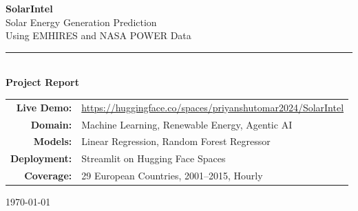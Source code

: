 \documentclass[12pt, a4paper]{article}
\begin{document}
\begin{titlepage}
    \centering
    \vspace*{1.5cm}

    {\huge\bfseries\color{solarblue} SolarIntel}\\[0.6cm]
    {\Large\color{solaramber} Solar Energy Generation Prediction}\\[0.3cm]
    {\large Using EMHIRES and NASA POWER Data}\\[0.4cm]
    \rule{\linewidth}{1.5pt}\\[0.8cm]

    {\large\textbf{Project Report}}

    \vspace{1.5cm}

    \begin{tabular}{rl}
        \textbf{Live Demo:} & \url{https://huggingface.co/spaces/priyanshutomar2024/SolarIntel} \\[4pt]
        \textbf{Domain:} & Machine Learning, Renewable Energy, Agentic AI \\[4pt]
        \textbf{Models:} & Linear Regression, Random Forest Regressor \\[4pt]
        \textbf{Deployment:} & Streamlit on Hugging Face Spaces \\[4pt]
        \textbf{Coverage:} & 29 European Countries, 2001--2015, Hourly \\
    \end{tabular}

    \vspace{2cm}

    \vfill
    {\large \today}
\end{titlepage}


\newpage
{\singlespacing
\tableofcontents
}
\newpage
\end{document}
